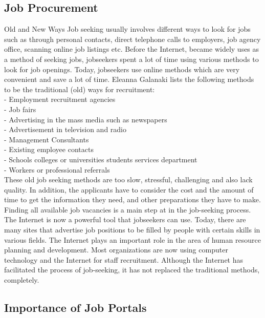 \documentclass[a4paper,12pt]{report}
\begin{document}
\subsection{Job Procurement}

\hspace*{12pt}Old and New Ways Job seeking usually involves different ways to look for jobs such as through personal contacts, direct telephone calls to employers, job agency office, scanning online job listings etc. Before the Internet, became widely uses as a method of seeking jobs, jobseekers spent a lot of time using various methods to look for job openings. Today, jobseekers use online methods which are very convenient and save a lot of time. Eleanna Galanaki lists the following methods to be the traditional (old) ways for recruitment:
\subitem
\\ - Employment recruitment agencies
\\ - Job fairs
\\ - Advertising in the mass media such as newspapers
\\ - Advertisement in television and radio
\\ - Management Consultants
\\ - Existing employee contacts
\\ - Schools colleges or universities students services department
\\ - Workers or professional referrals \\

These old job seeking methods are too slow, stressful, challenging and also lack quality. In addition, the applicants have to consider the cost and the amount of time to get the information they need, and other preparations they have to make. Finding all available job vacancies is a main step at in the job-seeking process. The Internet is now a powerful tool that jobseekers can use. Today, there are many sites that advertise job positions to be filled by people with certain skills in various fields. The Internet plays an important role in the area of human resource planning and development. Most organizations are now using computer technology and the Internet for staff recruitment. Although the Internet has facilitated the process of job-seeking, it has not replaced the traditional methods, completely.

\subsection{Importance of Job Portals}
\end{document}
